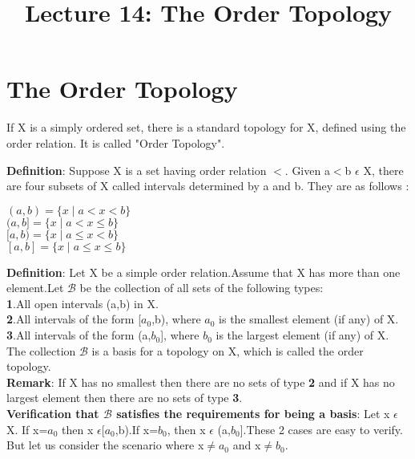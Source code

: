 \documentclass[a4paper,english,12pt]{article}
\title{\bf Lecture 14: The Order Topology}
\author{}
\begin{document}
\maketitle
\section{The Order Topology}
If X is a simply ordered set, there is a standard topology for X, defined using the order relation. It is called "Order Topology".\\
\begin{flushleft}
{\bf Definition}: Suppose X is a set having order relation $<$. Given a$<$b $\epsilon$ X, there are four subsets of X called intervals determined by a and b. They are as follows :\\
\begin{centering}
$(a,b)=\{x\mid a<x<b\}$\\
$(a,b]=\{x\mid a<x\leq b\}$\\
$[a,b)=\{x\mid a\leq x<b\}$\\
$[a,b]=\{x\mid a\leq x\leq b\}$\\
\end{centering}
\vspace{2mm}
{\bf Definition}: Let X be a simple order relation.Assume that X has more than one element.Let $\mathscr{B}$ be the collection of all sets of the following types:\\
\vspace{2mm}
{\bf 1}.All open intervals (a,b) in X.\\
{\bf 2}.All intervals of the form [$a_0$,b), where $a_0$ is the smallest element (if any) of X.\\
{\bf 3}.All intervals of the form (a,$b_0$], where $b_0$ is the largest element (if any) of X.\\
\vspace{2mm}
The collection $\mathscr{B}$ is a basis for a topology on X, which is called the order topology.\\
\vspace{1mm}
{\bf Remark}: If X has no smallest then there are no sets of type {\bf 2} and if X has no largest element then there are no sets of type {\bf 3}.\\
\vspace{1mm}
{\bf Verification that $\mathscr{B}$ satisfies the requirements for being a basis}: Let x $\epsilon$ X. If x=$a_0$ then x $\epsilon$[$a_0$,b).If x=$b_0$, then x $\epsilon$ (a,$b_0$].These 2 cases are easy to verify. But let us consider the scenario where x$\neq a_0$ and x$\neq b_0$.\\

\end{flushleft}
\end{document}
